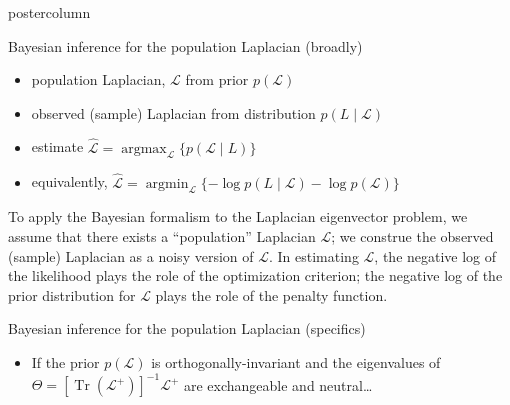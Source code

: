 \documentclass[final,hyperref={pdfpagelabels=false}]{beamer}
\DeclareMathOperator{\Tr}{Tr}
\DeclareMathOperator*{\argmax}{argmax}
\DeclareMathOperator*{\argmin}{argmin}
\newlength{\columnheight}
\begin{document}
\begin{frame}
\begin{columns}
    \begin{column}{.49\textwidth}
      \begin{beamercolorbox}[center,wd=\textwidth]{postercolumn}
        \begin{minipage}[T]{.95\textwidth} %
          \parbox[t][\columnheight]{\textwidth}{ %
            
            \begin{block}{Bayesian inference for the population Laplacian (broadly)}
  \begin{itemize}
    \item population Laplacian, $\mathcal{L}$ from prior $p(\mathcal{L})$
    \item observed (sample) Laplacian from distribution $p(L \mid \mathcal{L})$
    \item estimate $\mathcal{\hat L} = \argmax_{\mathcal{L}} \{ p(\mathcal{L} \mid L) \}$
    \item equivalently,
      $\mathcal{\hat L} = \argmin_{\mathcal{L}} \{ -\log p(L \mid \mathcal{L}) -\log p(\mathcal{L}) \}$
  \end{itemize}

  \vspace{1em}

  To apply the Bayesian formalism to the Laplacian eigenvector problem, we
assume that there exists a ``population'' Laplacian $\mathcal{L}$; we construe
the observed (sample) Laplacian as a noisy version of $\mathcal{L}$.  In
estimating $\mathcal{L}$, the negative log of the likelihood plays the role of
the optimization criterion; the negative log of the prior distribution for
$\mathcal{L}$ plays the role of the penalty function.
  
            \end{block}

            \vfill
            \begin{block}{Bayesian inference for the population Laplacian (specifics)}
	    \begin{itemize}
	      \item If the prior $p(\mathcal{L})$ is orthogonally-invariant and the
	        eigenvalues of $\Theta = [\Tr(\mathcal{L}^+)]^{-1} \mathcal{L}^{+}$
		are exchangeable and neutral\ldots


\end{itemize}
\end{block}}
\end{minipage}
\end{beamercolorbox}
\end{column}
\end{columns}
\end{frame}
\end{document}
